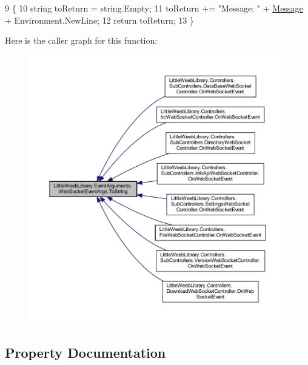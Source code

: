 \begin{DoxyCode}
9         \{
10             \textcolor{keywordtype}{string} toReturn = \textcolor{keywordtype}{string}.Empty;
11             toReturn += \textcolor{stringliteral}{"Message: "} + \mbox{\hyperlink{class_little_weeb_library_1_1_event_arguments_1_1_web_socket_event_args_ac7aee4603c5f55b11dd59de007b3a8b3}{Message}} + Environment.NewLine;
12             \textcolor{keywordflow}{return} toReturn;
13         \}
\end{DoxyCode}
Here is the caller graph for this function\+:\nopagebreak
\begin{figure}[H]
\begin{center}
\leavevmode
\includegraphics[width=350pt]{class_little_weeb_library_1_1_event_arguments_1_1_web_socket_event_args_acf402c2f7fd4ddbf175fea7f921ea879_icgraph}
\end{center}
\end{figure}


\subsection{Property Documentation}
\mbox{\label{class_little_weeb_library_1_1_event_arguments_1_1_web_socket_event_args_ac7aee4603c5f55b11dd59de007b3a8b3}} 
